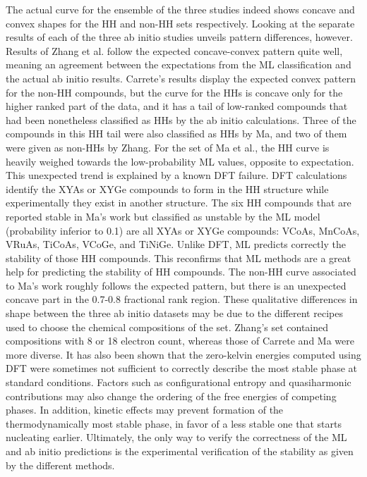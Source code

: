 \documentclass[pt10,journal=jacsat,manuscript=article,layout=twocolumn]{achemso}
\begin{document}
The actual curve for the ensemble of the three studies indeed shows concave and convex shapes for the HH and non-HH sets respectively. Looking at the separate results of each of the three ab initio studies unveils pattern differences, however. Results of Zhang et al. follow the expected concave-convex pattern quite well, meaning an agreement between the expectations from the ML classification and the actual ab initio results. Carrete's results display the expected convex pattern for the non-HH compounds, but the curve for the HHs is concave only for the higher ranked part of the data, and it has a tail of low-ranked compounds that had been nonetheless classified as HHs by the ab initio calculations. Three of the compounds in this HH tail were also classified as HHs by Ma, and two of them were given as non-HHs by Zhang. For the set of Ma et al., the HH curve is heavily weighed towards the low-probability ML values, opposite to expectation. This unexpected trend is explained by a known DFT failure. DFT calculations identify the XYAs or XYGe compounds to form in the HH structure while experimentally they exist in another structure\cite{Anovelp-typehalf-Heusler}. The six HH compounds that are reported stable in Ma's work but classified as unstable by the ML model (probability inferior to 0.1) are all XYAs or XYGe compounds: VCoAs, MnCoAs, VRuAs, TiCoAs, VCoGe, and TiNiGe. Unlike DFT, ML predicts correctly the stability of those HH compounds. This reconfirms that ML methods are a great help for predicting the stability of HH compounds. The non-HH curve associated to Ma's work roughly follows the expected pattern, but there is an unexpected concave part in the 0.7-0.8 fractional rank region. These qualitative differences in shape between the three ab initio datasets may be due to the different recipes used to choose the chemical compositions of the set. Zhang's set contained compositions with 8 or 18 electron count, whereas those of Carrete and Ma were more diverse. It has also been shown that the zero-kelvin energies computed using DFT were sometimes not sufficient to correctly describe the most stable phase at standard conditions\cite{Anovelp-typehalf-Heusler}. Factors such as configurational entropy and quasiharmonic contributions may also change the ordering of the free energies of competing phases\cite{benisek_vibrational_2015}. In addition, kinetic effects may prevent formation of the thermodynamically most stable phase, in favor of a less stable one that starts nucleating earlier\cite{Robusttopologicalsurfacestate}. Ultimately, the only way to verify the correctness of the ML and ab initio predictions is the experimental verification of the stability as given by the different methods.
\end{document}
